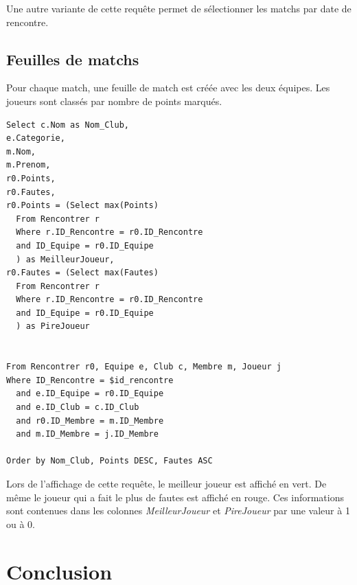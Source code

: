 \documentclass[a4paper»,8pt,french,fleqn]{report}
\begin{document}
Une autre variante de cette requête permet de sélectionner les matchs par date de rencontre.


\section{Feuilles de matchs}

Pour chaque match, une feuille de match est créée avec les deux équipes. Les joueurs sont classés par nombre de points marqués.

\begin{lstlisting}
Select c.Nom as Nom_Club,
e.Categorie,
m.Nom,
m.Prenom,
r0.Points,
r0.Fautes, 
r0.Points = (Select max(Points) 
  From Rencontrer r
  Where r.ID_Rencontre = r0.ID_Rencontre
  and ID_Equipe = r0.ID_Equipe
  ) as MeilleurJoueur,
r0.Fautes = (Select max(Fautes) 
  From Rencontrer r
  Where r.ID_Rencontre = r0.ID_Rencontre
  and ID_Equipe = r0.ID_Equipe
  ) as PireJoueur 
            

From Rencontrer r0, Equipe e, Club c, Membre m, Joueur j
Where ID_Rencontre = $id_rencontre
  and e.ID_Equipe = r0.ID_Equipe
  and e.ID_Club = c.ID_Club
  and r0.ID_Membre = m.ID_Membre
  and m.ID_Membre = j.ID_Membre

Order by Nom_Club, Points DESC, Fautes ASC
\end{lstlisting}

Lors de l'affichage de cette requête, le meilleur joueur est affiché en vert. De même le joueur qui a fait le plus de fautes est affiché en rouge. Ces informations sont contenues dans les colonnes \textit{MeilleurJoueur} et \textit{PireJoueur} par une valeur à 1 ou à 0.

\chapter*{Conclusion}
\end{document}
